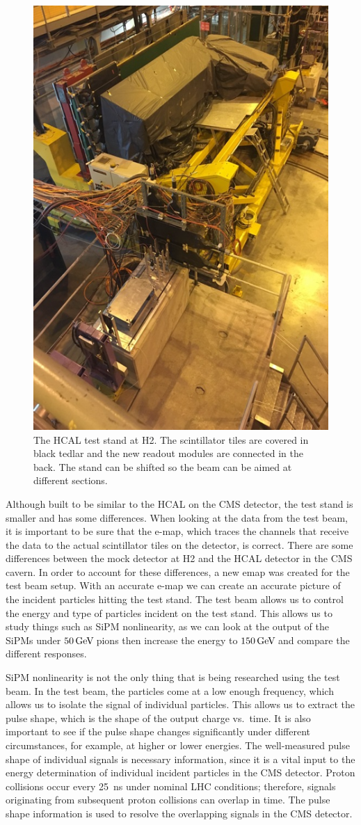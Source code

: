 \begin{figure}
\centering
\includegraphics[width=0.6\linewidth]{Figures/Teststand.png}
\caption{The HCAL test stand at H2. The scintillator tiles are covered in black tedlar and the new readout modules are connected in the back. The stand can be shifted so the beam can be aimed at different sections.}
\label{fig:stand}
\end{figure}

Although built to be similar to the HCAL on the CMS detector, the test stand is smaller and has some differences. When looking at the data from the test beam, it is important to be sure that the e-map, which traces the channels that receive the data to the actual scintillator tiles on the detector, is correct. There are some differences between the mock detector at H2 and the HCAL detector in the CMS cavern. In order to account for these differences, a new emap was created for the test beam setup. With an accurate e-map we can create an accurate picture of the incident particles hitting the test stand. The test beam allows us to control the energy and type of particles incident on the test stand. This allows us to study things such as SiPM nonlinearity, as we can look at the output of the SiPMs under $50 {\,\text{Ge\hspace{-.08em}V\hspace{-0.16em}}}$ pions then increase the energy to $150 {\,\text{Ge\hspace{-.08em}V\hspace{-0.16em}}}$ and compare the different responses. 

SiPM nonlinearity is not the only thing that is being researched using the test beam. In the test beam, the particles come at a low enough frequency, which allows us to isolate the signal of individual particles. This allows us to extract the pulse shape, which is the shape of the output charge vs.\ time. It is also important to see if the pulse shape changes significantly under different circumstances, for example, at higher or lower energies. The well-measured pulse shape of individual signals is necessary information, since it is a vital input to the energy determination of individual incident particles in the CMS detector. Proton collisions occur every 25~ns under nominal LHC conditions; therefore, signals originating from subsequent proton collisions can overlap in time. The pulse shape information is used to resolve the overlapping signals in the CMS detector.

